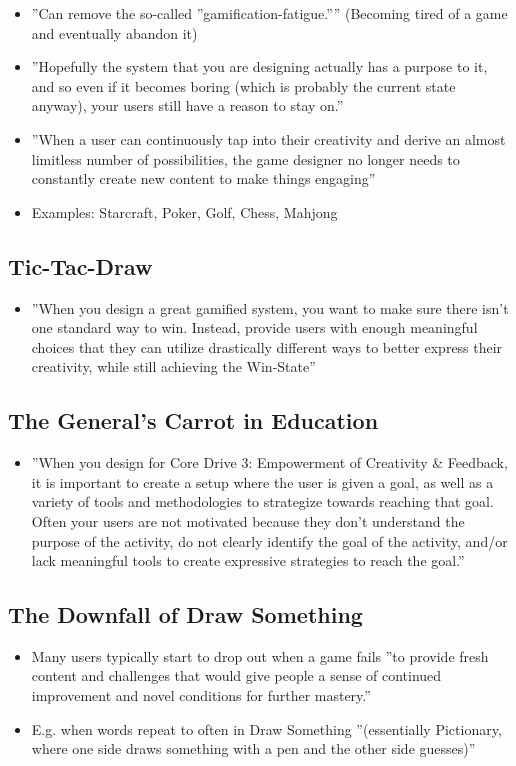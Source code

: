 \begin{itemize}
    \item ''Can remove the so-called ''gamification-fatigue.'''' (Becoming tired of a game and eventually abandon it)
    \item ''Hopefully the system that you are designing actually has a purpose to it, and so even if it becomes boring (which is probably the current state anyway), your users still have a reason to stay on.''
    \item ''When a user can continuously tap into their creativity and derive an almost limitless number of possibilities, the game designer no longer needs to constantly create new content to make things engaging''
    \item Examples: Starcraft, Poker, Golf, Chess, Mahjong
\end{itemize}

\subsection{Tic-Tac-Draw}
\begin{itemize}
    \item ''When you design a great gamified system, you want to make sure there isn't one standard way to win. Instead, provide users with enough meaningful choices that they can utilize drastically different ways to better express their creativity, while still achieving the Win-State''
\end{itemize}

\subsection{The General's Carrot in Education}
\begin{itemize}
    \item ''When you design for Core Drive 3: Empowerment of Creativity \& Feedback, it is important to create a setup where the user is given a goal, as well as a variety of tools and methodologies to strategize towards reaching that goal. Often your users are not motivated because they don't understand the purpose of the activity, do not clearly identify the goal of the activity, and/or lack meaningful tools to create expressive strategies to reach the goal.''
\end{itemize}

\subsection{The Downfall of Draw Something}
\begin{itemize}
    \item Many users typically start to drop out when a game fails ''to provide fresh content and challenges that would give people a sense of continued improvement and novel conditions for further mastery.''
    \item E.g. when words repeat to often in Draw Something ''(essentially Pictionary, where one side draws something with a pen and the other side guesses)''
\end{itemize}

